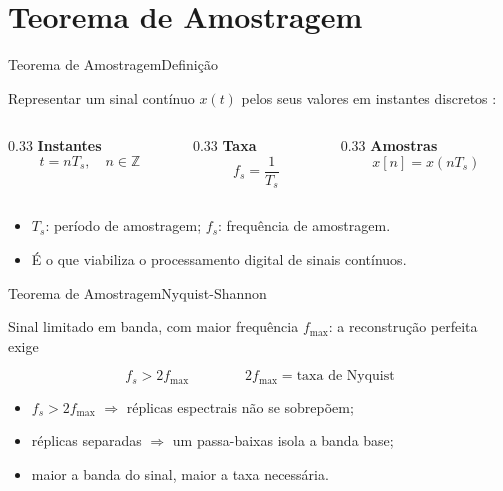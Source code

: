 \section{Teorema de Amostragem}


\begin{frame}{Teorema de Amostragem}{Definição}

	Representar um sinal contínuo $x(t)$ pelos seus valores em instantes
	discretos \cite{oppenheim1997signals}:

	\vspace{0.8em}
	\begin{columns}[T]
		\begin{column}{0.33\textwidth}
			\centering
			\textbf{Instantes}
			\[ t = nT_s,\quad n\in\mathbb{Z} \]
		\end{column}
		\begin{column}{0.33\textwidth}
			\centering
			\textbf{Taxa}
			\[ f_s = \frac{1}{T_s} \]
		\end{column}
		\begin{column}{0.33\textwidth}
			\centering
			\textbf{Amostras}
			\[ x[n] = x(nT_s) \]
		\end{column}
	\end{columns}

	\vspace{1.2em}
	\begin{itemize}
		\item $T_s$: período de amostragem; $f_s$: frequência de amostragem.
		\item É o que viabiliza o processamento digital de sinais contínuos.
	\end{itemize}

\end{frame}



\begin{frame}{Teorema de Amostragem}{Nyquist-Shannon}

	Sinal limitado em banda, com maior frequência $f_{\max}$: a reconstrução
	perfeita exige \cite{oppenheim1997signals}

	\[
	\boxed{f_s>2f_{\max}}
	\qquad\qquad
	2f_{\max} = \text{taxa de Nyquist}
	\]

	\vspace{0.8em}
	\begin{itemize}
		\item $f_s>2f_{\max}$ $\Rightarrow$ réplicas espectrais não se sobrepõem;
		\item réplicas separadas $\Rightarrow$ um passa-baixas isola a banda base;
		\item maior a banda do sinal, maior a taxa necessária.
	\end{itemize}

\end{frame}


